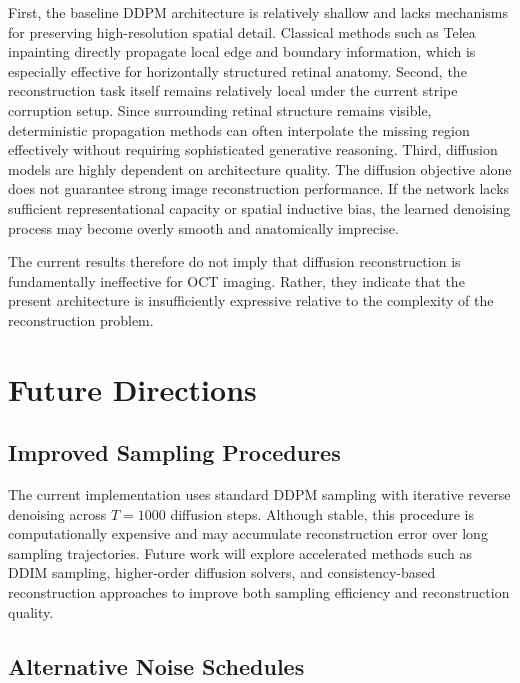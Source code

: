 \documentclass[12pt,oneside]{article}
\begin{document}
First, the baseline DDPM architecture is relatively shallow and lacks mechanisms for preserving high-resolution spatial detail. Classical methods such as Telea inpainting directly propagate local edge and boundary information, which is especially effective for horizontally structured retinal anatomy.
Second, the reconstruction task itself remains relatively local under the current stripe corruption setup. Since surrounding retinal structure remains visible, deterministic propagation methods can often interpolate the missing region effectively without requiring sophisticated generative reasoning.
Third, diffusion models are highly dependent on architecture quality. The diffusion objective alone does not guarantee strong image reconstruction performance. If the network lacks sufficient representational capacity or spatial inductive bias, the learned denoising process may become overly smooth and anatomically imprecise.

The current results therefore do not imply that diffusion reconstruction is fundamentally ineffective for OCT imaging. Rather, they indicate that the present architecture is insufficiently expressive relative to the complexity of the reconstruction problem.

\section{Future Directions}

\subsection{Improved Sampling Procedures}

The current implementation uses standard DDPM sampling with iterative reverse denoising across \(T=1000\) diffusion steps. Although stable, this procedure is computationally expensive and may accumulate reconstruction error over long sampling trajectories. Future work will explore accelerated methods such as DDIM sampling, higher-order diffusion solvers, and consistency-based reconstruction approaches to improve both sampling efficiency and reconstruction quality.

\subsection{Alternative Noise Schedules}
\end{document}
